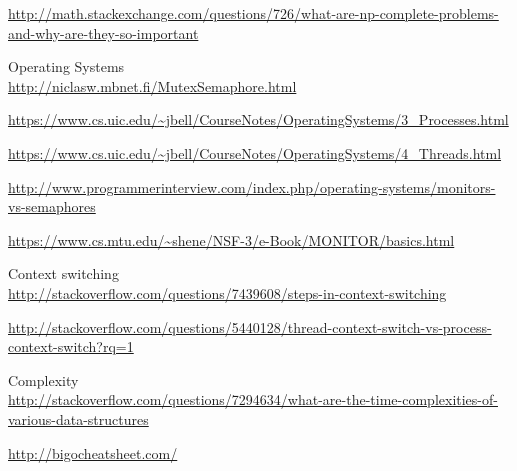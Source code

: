 \documentclass [12pt, executivepaper]{article}
\begin{document}
\begin{center}
\begin{thebibliography}{9}
\url{http://math.stackexchange.com/questions/726/what-are-np-complete-problems-and-why-are-they-so-important}

Operating Systems \\
\url{http://niclasw.mbnet.fi/MutexSemaphore.html}

\vspace{1mm}

\url{https://www.cs.uic.edu/~jbell/CourseNotes/OperatingSystems/3_Processes.html}

\vspace{1mm}

\url{https://www.cs.uic.edu/~jbell/CourseNotes/OperatingSystems/4_Threads.html}

\vspace{1mm}

\url{http://www.programmerinterview.com/index.php/operating-systems/monitors-vs-semaphores}

\vspace{1mm}

\url{https://www.cs.mtu.edu/~shene/NSF-3/e-Book/MONITOR/basics.html}

Context switching \\

\url{http://stackoverflow.com/questions/7439608/steps-in-context-switching}

\pagebreak

\vspace*{-40mm}

\url{http://stackoverflow.com/questions/5440128/thread-context-switch-vs-process-context-switch?rq=1}

Complexity \\
\url{http://stackoverflow.com/questions/7294634/what-are-the-time-complexities-of-various-data-structures}

\vspace{1mm}

\url{http://bigocheatsheet.com/}

\end{thebibliography}

\end{center}
\end{document}
